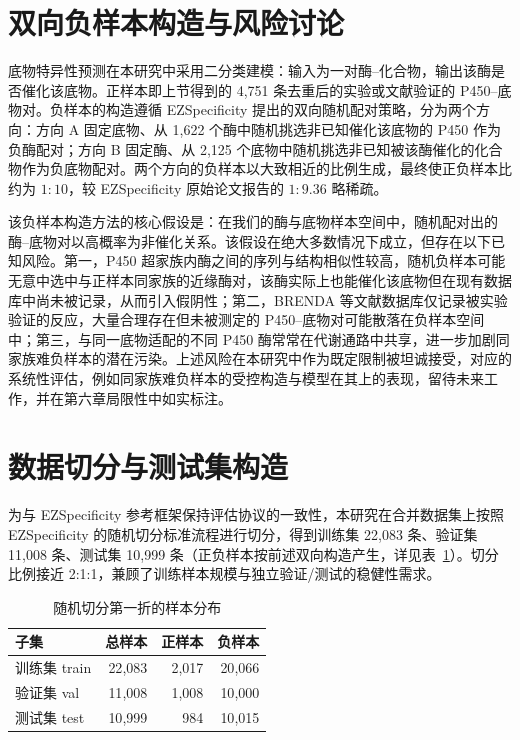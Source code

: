 \section{双向负样本构造与风险讨论}
\label{sec:negatives}

底物特异性预测在本研究中采用二分类建模：输入为一对酶--化合物，输出该酶是否催化该底物。正样本即上节得到的 4{,}751 条去重后的实验或文献验证的 P450--底物对。负样本的构造遵循 EZSpecificity 提出的双向随机配对策略\cite{EZSpec2025}，分为两个方向：方向 A 固定底物、从 1{,}622 个酶中随机挑选非已知催化该底物的 P450 作为负酶配对；方向 B 固定酶、从 2{,}125 个底物中随机挑选非已知被该酶催化的化合物作为负底物配对。两个方向的负样本以大致相近的比例生成，最终使正负样本比约为 $1:10$，较 EZSpecificity 原始论文报告的 $1:9.36$ 略稀疏。

该负样本构造方法的核心假设是：在我们的酶与底物样本空间中，随机配对出的酶--底物对以高概率为非催化关系。该假设在绝大多数情况下成立，但存在以下已知风险。第一，P450 超家族内酶之间的序列与结构相似性较高，随机负样本可能无意中选中与正样本同家族的近缘酶对，该酶实际上也能催化该底物但在现有数据库中尚未被记录，从而引入假阴性；第二，BRENDA\cite{Chang2021} 等文献数据库仅记录被实验验证的反应，大量合理存在但未被测定的 P450--底物对可能散落在负样本空间中；第三，与同一底物适配的不同 P450 酶常常在代谢通路中共享，进一步加剧同家族难负样本的潜在污染。上述风险在本研究中作为既定限制被坦诚接受，对应的系统性评估，例如同家族难负样本的受控构造与模型在其上的表现，留待未来工作，并在第六章局限性中如实标注。

\section{数据切分与测试集构造}
\label{sec:splits}

为与 EZSpecificity 参考框架保持评估协议的一致性，本研究在合并数据集上按照 EZSpecificity 的随机切分标准流程进行切分，得到训练集 22{,}083 条、验证集 11{,}008 条、测试集 10{,}999 条（正负样本按前述双向构造产生，详见表~\ref{tab:ch3-splits}）。切分比例接近 2:1:1，兼顾了训练样本规模与独立验证/测试的稳健性需求。

\begin{table}[htbp]
  \centering
  \caption{随机切分第一折的样本分布}
  \label{tab:ch3-splits}
  \begin{tabular}{lrrr}
    \toprule
    子集 & 总样本 & 正样本 & 负样本 \\
    \midrule
    训练集 train      & 22{,}083 & 2{,}017 & 20{,}066 \\
    验证集 val        & 11{,}008 & 1{,}008 & 10{,}000 \\
    测试集 test       & 10{,}999 & 984   & 10{,}015 \\
    \bottomrule
  \end{tabular}
\end{table}

